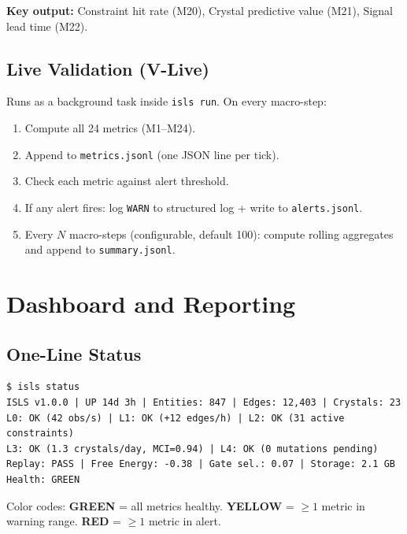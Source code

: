 \documentclass[10pt,a4paper]{article}
\begin{document}
\textbf{Key output:} Constraint hit rate (M20), Crystal predictive value (M21), Signal lead time (M22).

\subsection{Live Validation (V-Live)}

Runs as a background task inside \texttt{isls run}. On every macro-step:

\begin{enumerate}[nosep]
\item Compute all 24 metrics (M1--M24).
\item Append to \texttt{metrics.jsonl} (one JSON line per tick).
\item Check each metric against alert threshold.
\item If any alert fires: log \texttt{WARN} to structured log + write to \texttt{alerts.jsonl}.
\item Every $N$ macro-steps (configurable, default 100): compute rolling aggregates and append to \texttt{summary.jsonl}.
\end{enumerate}

\section{Dashboard and Reporting}
\label{sec:dashboard}

\subsection{One-Line Status}

\begin{cmdbox}
\begin{lstlisting}[style=sh]
$ isls status
ISLS v1.0.0 | UP 14d 3h | Entities: 847 | Edges: 12,403 | Crystals: 23
L0: OK (42 obs/s) | L1: OK (+12 edges/h) | L2: OK (31 active constraints)
L3: OK (1.3 crystals/day, MCI=0.94) | L4: OK (0 mutations pending)
Replay: PASS | Free Energy: -0.38 | Gate sel.: 0.07 | Storage: 2.1 GB
Health: GREEN
\end{lstlisting}
\end{cmdbox}

Color codes: \textcolor{success}{\textbf{GREEN}} = all metrics healthy. \textcolor{warn}{\textbf{YELLOW}} = $\geq 1$ metric in warning range. \textcolor{danger}{\textbf{RED}} = $\geq 1$ metric in alert.
\end{document}
